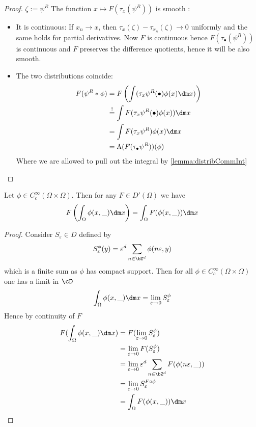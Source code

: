 	\begin{proof}
		$\zeta := \psi^R$
		The function $x \mapsto F(\tau_x(\psi^R))$ is smooth : 
		\begin{itemize}
			\item It is continuous: If $x_n \to x$, then $\tau_x (\zeta) - \tau_{x_n}(\zeta) \to 0 $ uniformly and the same holds for partial derivatives. Now $F$ is continuous hence $F(\tau_{\bullet}(\psi^R))$ is continuous and $F$ preserves the difference quotients, hence it will be also smooth. 
			\item The two distributions coincide:
			\begin{align*}
				F(\psi^R * \phi)  &= F \left(\int(\tau_x \psi^R(\bullet) \phi(x) \dm x) \right) \\
				&\overset{!}{=} \int F(\tau_x \psi^R(\bullet) \phi(x)) \dm x \\
				&= \int F(\tau_x \psi^R) \phi(x) \dm x \\
				&= \Lambda(F(\tau_{\bullet} \psi^R))(\phi)
			\end{align*}
			Where we are allowed to pull out the integral by \ref{lemma:distribCommInt}
		\end{itemize}
	\end{proof}
	\begin{lemma}{\label{lemma:distribCommInt}}
		Let $\phi \in C_c^{\infty}(\Omega \times \Omega)$. Then for any $F \in D'(\Omega)$ we have
		\[
		F \left(\int_\Omega \phi(x,\_) \dm x \right) = \int_\Omega F(\phi(x ,\_)) \dm x
		\]
	\end{lemma}
	\begin{proof}
		Consider $S_\varepsilon \in D$ defined by
		\[S_\varepsilon^\phi(y) = \varepsilon^d \sum_{n \in \bZ^d} \phi(n \varepsilon,y)\]
		which is a finite sum as $\phi$ has compact support.
		Then for all $\phi \in C_c^\infty(\Omega \times \Omega)$ one has a limit in $\cD$
		\[
		\int_\Omega \phi(x,\_) \dm x = \lim_{\varepsilon \to 0} S^\phi_\varepsilon
		\]
		Hence by continuity of $F$
		\begin{align*}
			F(\int_\Omega \phi(x,\_) \dm x) &= F(\lim_{\varepsilon \to 0} S^\phi_\varepsilon)     \\
			&= \lim_{\varepsilon \to 0} F(S^\phi_\varepsilon)     \\
			&= \lim_{\varepsilon \to 0} \varepsilon^d \sum_{n \in \bZ^d} F(\phi(n \varepsilon,\_))     \\
			&= \lim_{\varepsilon \to 0} S^{F \circ \phi}_\varepsilon \\
			&= \int_\Omega F(\phi(x,\_)) \dm x
		\end{align*}
	\end{proof}
